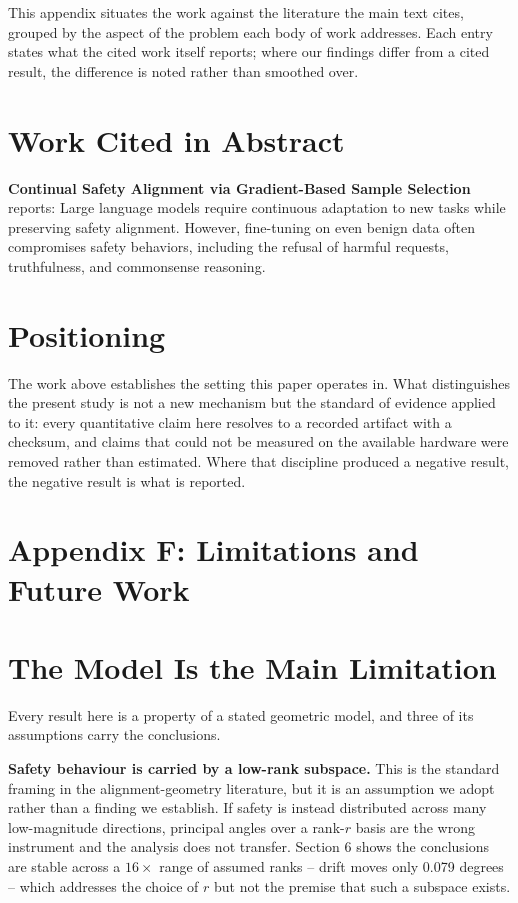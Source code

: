 \documentclass[10pt,twocolumn,letterpaper]{article}
\begin{document}
This appendix situates the work against the literature the main text cites, grouped by the aspect of the problem each body of work addresses. Each entry states what the cited work itself reports; where our findings differ from a cited result, the difference is noted rather than smoothed over.


\section{Work Cited in Abstract}


\textbf{Continual Safety Alignment via Gradient-Based Sample Selection} \cite{arxiv_2604_17215} reports: Large language models require continuous adaptation to new tasks while preserving safety alignment. However, fine-tuning on even benign data often compromises safety behaviors, including the refusal of harmful requests, truthfulness, and commonsense reasoning.


\section{Positioning}


The work above establishes the setting this paper operates in. What distinguishes the present study is not a new mechanism but the standard of evidence applied to it: every quantitative claim here resolves to a recorded artifact with a checksum, and claims that could not be measured on the available hardware were removed rather than estimated. Where that discipline produced a negative result, the negative result is what is reported.





\section{Appendix F: Limitations and Future Work}



\section{The Model Is the Main Limitation}


Every result here is a property of a stated geometric model, and three of its assumptions carry the conclusions.

\textbf{Safety behaviour is carried by a low-rank subspace.} This is the standard framing in the alignment-geometry literature, but it is an assumption we adopt rather than a finding we establish. If safety is instead distributed across many low-magnitude directions, principal angles over a rank-$r$ basis are the wrong instrument and the analysis does not transfer. Section 6 shows the conclusions are stable across a $16\times$ range of assumed ranks -- drift moves only 0.079 degrees -- which addresses the choice of $r$ but not the premise that such a subspace exists.
\end{document}
